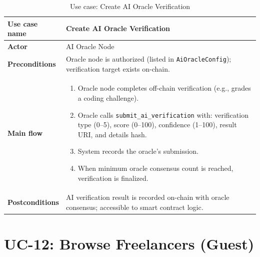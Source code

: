 \begin{table}[H]
\centering
\caption{Use case: Create AI Oracle Verification}
\begin{tabular}{|l|p{10cm}|}
\hline
\textbf{Use case name} & Create AI Oracle Verification \\ \hline
\textbf{Actor} & AI Oracle Node \\ \hline
\textbf{Preconditions} & Oracle node is authorized (listed in \texttt{AiOracleConfig}); verification target exists on-chain. \\ \hline
\textbf{Main flow} & \begin{enumerate}[noitemsep]
    \item Oracle node completes off-chain verification (e.g., grades a coding challenge).
    \item Oracle calls \texttt{submit\_ai\_verification} with: verification type (0--5), score (0--100), confidence (1--100), result URI, and details hash.
    \item System records the oracle's submission.
    \item When minimum oracle consensus count is reached, verification is finalized.
\end{enumerate} \\ \hline
\textbf{Postconditions} & AI verification result is recorded on-chain with oracle consensus; accessible to smart contract logic. \\ \hline
\end{tabular}
\end{table}

\section*{UC-12: Browse Freelancers (Guest)}

